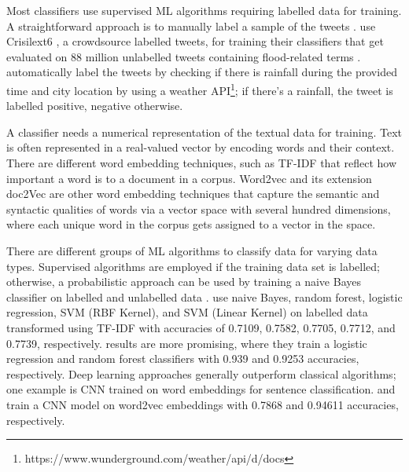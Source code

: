 Most classifiers use supervised \ac{ML} algorithms requiring labelled data for training. A
straightforward approach is to manually label a sample of the tweets
\cite{debruijnGlobalDatabaseHistoric2019b}\cite{barkerDevelopmentNationalscaleRealtime2019}.
 use Crisilext6
\cite{olteanuCrisisLexLexiconCollecting2014}, a crowdsource labelled tweets, for training their
classifiers that get evaluated on 88 million unlabelled tweets containing flood-related terms
\cite{DVN/T3ZFMR_2019}.  automatically label the tweets by
checking if there is rainfall during the provided time and city location by using a weather
\ac{API}\footnote{https://www.wunderground.com/weather/api/d/docs}; if there's a rainfall, the tweet
is labelled positive, negative otherwise.

A classifier needs a numerical representation of the textual data for training. Text is often
represented in a real-valued vector by encoding words and their context. There are different word
embedding techniques, such as \ac{TF-IDF} \cite{enwiki:1123031029} that reflect how important a word
is to a document in a corpus. Word2vec \cite{mikolovEfficientEstimationWord2013} and its extension
doc2Vec \cite{leDistributedRepresentationsSentences2014} are other word embedding techniques that
capture the semantic and syntactic qualities of words via a vector space with several hundred
dimensions, where each unique word in the corpus gets assigned to a vector in the space.

There are different groups of \ac{ML} algorithms to classify data for varying data types. Supervised
algorithms are employed if the training data set is labelled; otherwise, a probabilistic approach
can be used by training a naive Bayes classifier on  labelled and unlabelled data
\cite{liDisasterResponseAided2018}.  use naive Bayes,
random forest, logistic regression, \ac{SVM} (RBF Kernel), and \ac{SVM} (Linear Kernel) on labelled
data transformed using \ac{TF-IDF} with accuracies of 0.7109, 0.7582, 0.7705, 0.7712, and 0.7739,
respectively.  results are more promising,
where they train a logistic regression and random forest classifiers with 0.939 and 0.9253
accuracies, respectively. Deep learning approaches  generally outperform classical algorithms; one
example is \ac{CNN} trained on word embeddings for sentence classification.
 and
 train a \ac{CNN} model on word2vec
embeddings with 0.7868 and 0.94611 accuracies, respectively.

